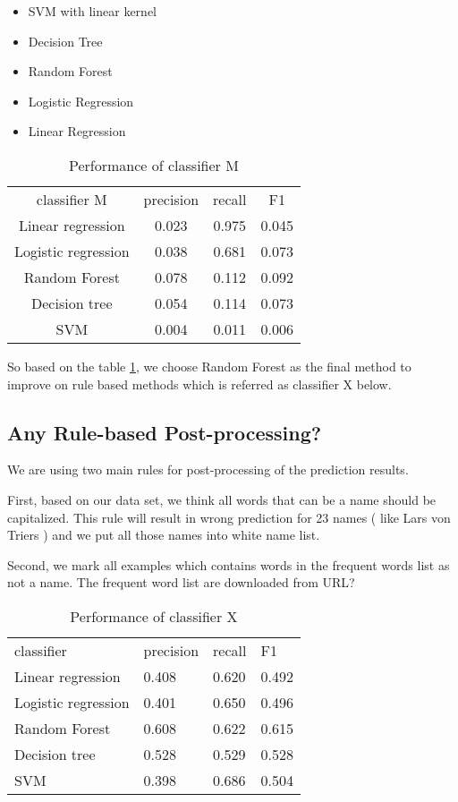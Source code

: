 \documentclass{article}
\begin{document}
\begin{itemize}
\setlength\itemsep{0.01em}
\item SVM with linear kernel
\item Decision Tree
\item Random Forest
\item Logistic Regression
\item Linear Regression
\end{itemize}

\begin{table}[h]
\centering
\caption{Performance of classifier M}
\label{table1}
\begin{tabular}{c|c|c|c}
classifier   M    & precision & recall & F1     \\  
Linear regression   & 0.023     & 0.975  & 0.045 \\  
Logistic regression & 0.038     & 0.681  & 0.073 \\  
Random Forest       & 0.078     & 0.112  & 0.092 \\  
Decision tree       & 0.054     & 0.114  & 0.073 \\  
SVM                 & 0.004     & 0.011  & 0.006  
\end{tabular}
\end{table}

So based on the table \ref{table1}, we choose Random Forest as the final method to improve on rule based methods which is referred as classifier X below.

\subsection{Any Rule-based Post-processing?}

We are using two main rules for post-processing of the prediction results. 

First, based on our data set, we think all words that can be a name should be capitalized.  This rule will result in wrong prediction for 23 names ( like Lars von Triers  ) and we put all those names into white name list.

Second, we mark all examples which contains words in the frequent words list as not a name. The frequent word list are downloaded from URL?

\begin{table}[h]
\centering
\caption{Performance of classifier X}
\label{my-label2}
\begin{tabular}{llll}
classifier          & precision & recall & F1    \\
Linear regression   & 0.408     & 0.620  & 0.492 \\
Logistic regression & 0.401     & 0.650  & 0.496 \\
Random Forest       & 0.608     & 0.622  & 0.615 \\
Decision tree       & 0.528     & 0.529  & 0.528 \\
SVM                 & 0.398     & 0.686  & 0.504
\end{tabular}
\end{table}
\end{document}
